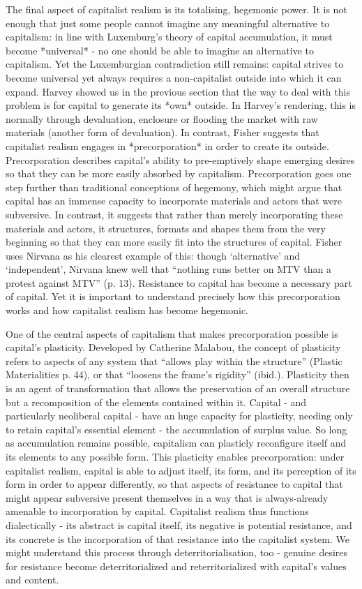 The final aspect of capitalist realism is its totalising, hegemonic
power. It is not enough that just some people cannot imagine any
meaningful alternative to capitalism: in line with Luxemburg's theory of
capital accumulation, it must become *universal* - no one should be able
to imagine an alternative to capitalism. Yet the Luxemburgian
contradiction still remains: capital strives to become universal yet
always requires a non-capitalist outside into which it can expand.
Harvey showed us in the previous section that the way to deal with this
problem is for capital to generate its *own* outside. In Harvey's
rendering, this is normally through devaluation, enclosure or flooding
the market with raw materials (another form of devaluation). In
contrast, Fisher suggests that capitalist realism engages in
*precorporation* in order to create its outside. Precorporation
describes capital's ability to pre-emptively shape emerging desires so
that they can be more easily absorbed by capitalism. Precorporation goes
one step further than traditional conceptions of hegemony, which might
argue that capital has an immense capacity to incorporate materials and
actors that were subversive. In contrast, it suggests that rather than
merely incorporating these materials and actors, it structures, formats
and shapes them from the very beginning so that they can more easily fit
into the structures of capital. Fisher uses Nirvana as his clearest
example of this: though `alternative' and `independent', Nirvana knew
well that ``nothing runs better on MTV than a protest against MTV'' (p.
13). Resistance to capital has become a necessary part of capital. Yet
it is important to understand precisely how this precorporation works
and how capitalist realism has become hegemonic.

One of the central aspects of capitalism that makes precorporation
possible is capital's plasticity. Developed by Catherine Malabou, the
concept of plasticity refers to aspects of any system that ``allows play
within the structure'' (Plastic Materialities p. 44), or that ``loosens
the frame's rigidity'' (ibid.). Plasticity then is an agent of
transformation that allows the preservation of an overall structure but
a recomposition of the elements contained within it. Capital - and
particularly neoliberal capital - have an huge capacity for plasticity,
needing only to retain capital's essential element - the accumulation of
surplus value. So long as accumulation remains possible, capitalism can
plasticly reconfigure itself and its elements to any possible form. This
plasticity enables precorporation: under capitalist realism, capital is
able to adjust itself, its form, and its perception of its form in order
to appear differently, so that aspects of resistance to capital that
might appear subversive present themselves in a way that is
always-already amenable to incorporation by capital. Capitalist realism
thus functions dialectically - its abstract is capital itself, its
negative is potential resistance, and its concrete is the incorporation
of that resistance into the capitalist system. We might understand this
process through deterritorialisation, too - genuine desires for
resistance become deterritorialized and reterritorialized with capital's
values and content.

